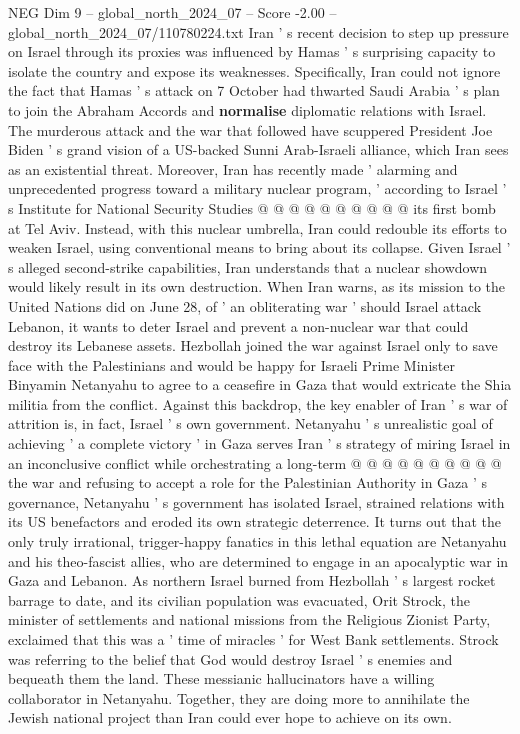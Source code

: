 \begin{textsample}{NEG Dim 9 – global\_north\_2024\_07 – Score -2.00 – global\_north\_2024\_07/110780224.txt}
Iran ' s recent decision to step up pressure on Israel through its proxies was influenced by Hamas ' s surprising capacity to isolate the country and expose its weaknesses.
Specifically, Iran could not ignore the fact that Hamas ' s attack on 7 October had thwarted Saudi Arabia ' s plan to join the Abraham Accords and \textbf{normalise} diplomatic relations with Israel.
The murderous attack and the war that followed have scuppered President Joe Biden ' s grand vision of a US-backed Sunni Arab-Israeli alliance, which Iran sees as an existential threat.
Moreover, Iran has recently made ' alarming and unprecedented progress toward a military nuclear program, ' according to Israel ' s Institute for National Security Studies @ @ @ @ @ @ @ @ @ @ its first bomb at Tel Aviv.
Instead, with this nuclear umbrella, Iran could redouble its efforts to weaken Israel, using conventional means to bring about its collapse.
Given Israel ' s alleged second-strike capabilities, Iran understands that a nuclear showdown would likely result in its own destruction.
When Iran warns, as its mission to the United Nations did on June 28, of ' an obliterating war ' should Israel attack Lebanon, it wants to deter Israel and prevent a non-nuclear war that could destroy its Lebanese assets.
Hezbollah joined the war against Israel only to save face with the Palestinians and would be happy for Israeli Prime Minister Binyamin Netanyahu to agree to a ceasefire in Gaza that would extricate the Shia militia from the conflict.
Against this backdrop, the key enabler of Iran ' s war of attrition is, in fact, Israel ' s own government.
Netanyahu ' s unrealistic goal of achieving ' a complete victory ' in Gaza serves Iran ' s strategy of miring Israel in an inconclusive conflict while orchestrating a long-term @ @ @ @ @ @ @ @ @ @ the war and refusing to accept a role for the Palestinian Authority in Gaza ' s governance, Netanyahu ' s government has isolated Israel, strained relations with its US benefactors and eroded its own strategic deterrence.
It turns out that the only truly irrational, trigger-happy fanatics in this lethal equation are Netanyahu and his theo-fascist allies, who are determined to engage in an apocalyptic war in Gaza and Lebanon.
As northern Israel burned from Hezbollah ' s largest rocket barrage to date, and its civilian population was evacuated, Orit Strock, the minister of settlements and national missions from the Religious Zionist Party, exclaimed that this was a ' time of miracles ' for West Bank settlements.
Strock was referring to the belief that God would destroy Israel ' s enemies and bequeath them the land.
These messianic hallucinators have a willing collaborator in Netanyahu.
Together, they are doing more to annihilate the Jewish national project than Iran could ever hope to achieve on its own.

\end{textsample}
